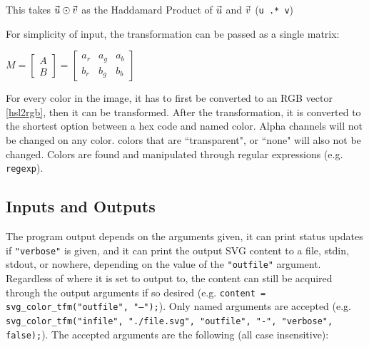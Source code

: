\documentclass[12pt]{article}
\newcommand \hpx [1]{\hspace{#1px}}
\newcommand \nhpx [1]{\hspace{-#1px}}
\newcommand \iindent  {\indent \indent}
\newcommand \iiindent {\indent \iindent}
\newcommand \uvec {\nhpx 1 \vec{\hpx 1 u}}
\newcommand \vvec {\nhpx 1 \vec{\hpx 1 v}}
\begin{document}
\noindent This takes $\uvec \odot \vvec$ as the Haddamard Product of $\uvec$ and
$\vvec$ (\texttt{\textcolor{variable}u \textcolor{operator}{.*} \textcolor{variable}v})
\vspace{5px}

\noindent For simplicity of input, the transformation can be passed as a single matrix:

$M = \begin{bmatrix}
	A \\ B
\end{bmatrix} = \begin{bmatrix}
	a_r & a_g & a_b \\
	b_r & b_g & b_b
\end{bmatrix}$

\iindent For every color in the image, it has to first be converted to an RGB vector
\ref{hsl2rgb}, then it can be transformed. After the transformation, it is converted
to the shortest option between a hex code and named color. Alpha channels will not be
changed on any color. colors that are ``transparent", or ``none" will also not be
changed. Colors are found and manipulated through regular expressions (e.g.
\textcolor{function}{\texttt{regexp}}).

\subsection{Inputs and Outputs}

\iiindent The program output depends on the arguments given, it can print status
updates if {\tt "verbose"} is given, and it can print the output SVG content to
a file, stdin, stdout, or nowhere, depending on the value of the {\tt "outfile"}
argument. Regardless of where it is set to output to, the content can still be
acquired through the output arguments if so desired (e.g. {\tt content =
svg\_color\_tfm("outfile", "---");}). Only named arguments are accepted (e.g.
{\tt svg\_color\_tfm("infile", "./file.svg", "outfile", "-", "verbose", false);}).
The accepted arguments are the following (all case insensitive):
\end{document}
